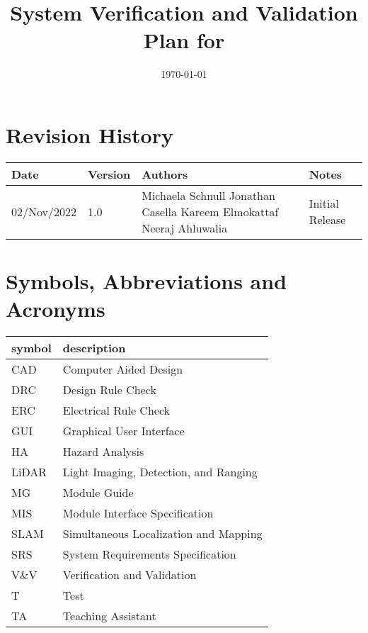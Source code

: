 \documentclass[12pt, titlepage]{article}
\begin{document}
\title{System Verification and Validation Plan for \progname{}} 
\author{\authname}
\date{\today}
	
\maketitle


\section{Revision History}

\begin{tabularx}{\textwidth}{p{3cm}p{2cm}p{4cm}X}
\toprule {\bf Date} & {\bf Version} & {\bf Authors} & {\bf Notes}\\
\midrule
02/Nov/2022 & 1.0 & Michaela Schnull \newline Jonathan Casella \newline Kareem Elmokattaf \newline Neeraj Ahluwalia & Initial Release\\
\bottomrule
\end{tabularx}

\newpage

\tableofcontents

\listoftables
{}

\newpage

\section{Symbols, Abbreviations and Acronyms}

\renewcommand{\arraystretch}{1.2}
\begin{tabular}{l l} 
  \toprule		
  \textbf{symbol} & \textbf{description}\\
  \midrule 
  CAD & Computer Aided Design\\
  DRC & Design Rule Check\\
  ERC & Electrical Rule Check\\
  GUI & Graphical User Interface\\
  HA & Hazard Analysis\\
  LiDAR & Light Imaging, Detection, and Ranging\\
  MG & Module Guide\\
  MIS & Module Interface Specification\\
  SLAM & Simultaneous Localization and Mapping\\
  SRS & System Requirements Specification\\
  V\&V & Verification and Validation\\
  T & Test\\
  TA & Teaching Assistant\\
  \bottomrule
\end{tabular}\\
\end{document}
